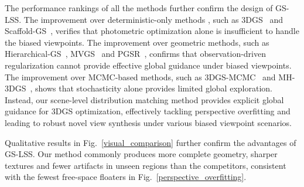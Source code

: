 \documentclass[lettersize,journal]{IEEEtran}
\begin{document}
The performance rankings of all the methods further confirm the design of GS-LSS. The improvement over deterministic-only methods
, such as 3DGS~\cite{3dgs} and Scaffold-GS~\cite{scaffold}, 
verifies that photometric optimization alone is insufficient to handle the biased viewpoints.
The improvement over geometric methods, such as Hierarchical-GS~\cite{hierarchical}, MVGS~\cite{mvgs} and PGSR~\cite{pgsr}, 
confirms that observation-driven regularization cannot provide effective global guidance under biased viewpoints. 
The improvement over MCMC-based methods, such as 3DGS-MCMC~\cite{mcmc} and MH-3DGS~\cite{mh3dgs}, shows that
stochasticity alone provides limited global exploration. 
Instead, our scene-level distribution matching method provides explicit global guidance for 3DGS optimization, effectively tackling perspective overfitting and leading to robust novel view synthesis under various biased viewpoint scenarios. 

Qualitative results in Fig.~\ref{visual_comparison} further confirm the advantages of GS-LSS. Our method commonly produces more complete geometry, sharper textures and fewer artifacts in unseen regions than the competitors, consistent with the fewest free-space floaters in Fig.~\ref{perspective_overfitting}. 
\end{document}

